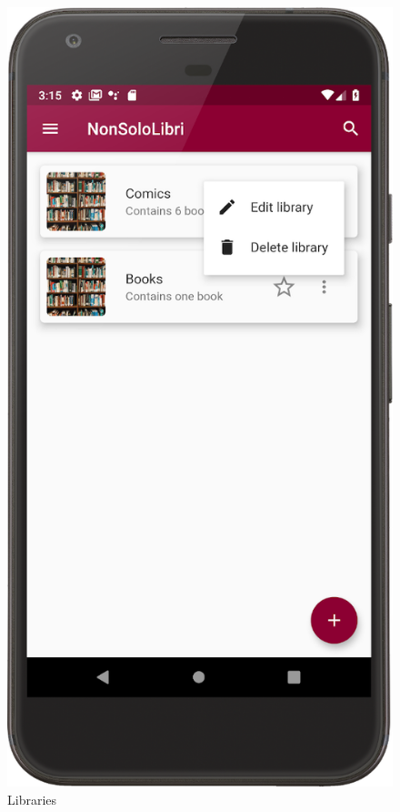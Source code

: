 \begin{figure}[!htb]
\begin{minipage}[b]{0.3\textwidth}
    \end{minipage}
    \hfill
    \begin{minipage}[b]{0.3\textwidth}
        \includegraphics[scale=1]{images/libraries-page.png}
        \caption{Libraries}

\end{minipage}
\end{figure}

